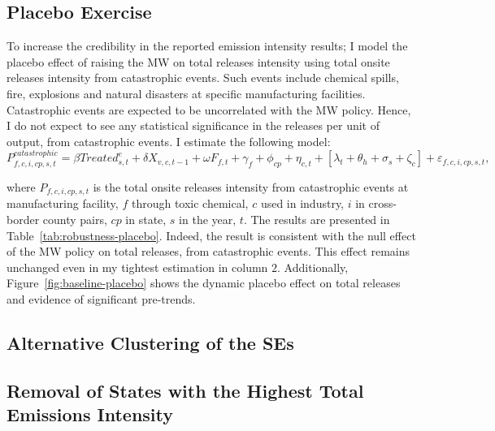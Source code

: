 \documentclass[12pt, english]{article}
\begin{document}
    \subsection{Placebo Exercise}\label{subsec:placebo-exercise}
    To increase the credibility in the reported emission intensity results; I model the placebo effect of raising the MW on total releases intensity using total onsite releases intensity from catastrophic events. Such events include chemical spills, fire, explosions and natural disasters at specific manufacturing facilities. Catastrophic events are expected to be uncorrelated with the MW policy. Hence, I do not expect to see any statistical significance in the releases per unit of output, from catastrophic events. I estimate the following model:
    \begin{equation}
        P_{f,c,i,cp,s,t}^{catastrophic} = \beta Treated_{s,t}^e + \delta X_{v,c,t-1} + \omega F_{f,t} + \gamma_{f} + \phi_{cp} + \eta_{c,t} + \left[\lambda_{t} + \theta_{h} + \sigma_{s} + \zeta_{c} \right] + \varepsilon_{f,c,i,cp,s,t},\label{eq:robustness-placebo}
    \end{equation}
    

    where $P_{f,c,i,cp,s,t}$ is the total onsite releases intensity from catastrophic events at manufacturing facility, $f$ through toxic chemical, $c$ used in industry, $i$ in cross-border county pairs, $cp$ in state, $s$ in the year, $t$. The results are presented in Table~\ref{tab:robustness-placebo}. Indeed, the result is consistent with the null effect of the MW policy on total releases, from catastrophic events. This effect remains unchanged even in my tightest estimation in column $2$. Additionally, Figure~\ref{fig:baseline-placebo} shows the dynamic placebo effect on total releases and evidence of significant pre-trends.
    

    \subsection{Alternative Clustering of the SEs}\label{subsec:alternative-clustering-of-the-ses}
    
    
    
    

    \subsection{Removal of States with the Highest Total Emissions Intensity}\label{subsec:removal-of-states-with-the-highest-total-emissions-intensity}
\end{document}
